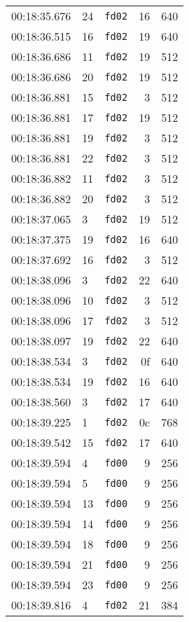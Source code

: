 \documentclass{article}
\begin{document}
\begin{longtable}{lllrr}
00:18:35.676 & 24 & \texttt{fd02} & 16 & 640 \\
00:18:36.515 & 16 & \texttt{fd02} & 19 & 640 \\
00:18:36.686 & 11 & \texttt{fd02} & 19 & 512 \\
00:18:36.686 & 20 & \texttt{fd02} & 19 & 512 \\
00:18:36.881 & 15 & \texttt{fd02} & 3 & 512 \\
00:18:36.881 & 17 & \texttt{fd02} & 19 & 512 \\
00:18:36.881 & 19 & \texttt{fd02} & 3 & 512 \\
00:18:36.881 & 22 & \texttt{fd02} & 3 & 512 \\
00:18:36.882 & 11 & \texttt{fd02} & 3 & 512 \\
00:18:36.882 & 20 & \texttt{fd02} & 3 & 512 \\
00:18:37.065 & 3 & \texttt{fd02} & 19 & 512 \\
00:18:37.375 & 19 & \texttt{fd02} & 16 & 640 \\
00:18:37.692 & 16 & \texttt{fd02} & 3 & 512 \\
00:18:38.096 & 3 & \texttt{fd02} & 22 & 640 \\
00:18:38.096 & 10 & \texttt{fd02} & 3 & 512 \\
00:18:38.096 & 17 & \texttt{fd02} & 3 & 512 \\
00:18:38.097 & 19 & \texttt{fd02} & 22 & 640 \\
00:18:38.534 & 3 & \texttt{fd02} & 0f & 640 \\
00:18:38.534 & 19 & \texttt{fd02} & 16 & 640 \\
00:18:38.560 & 3 & \texttt{fd02} & 17 & 640 \\
00:18:39.225 & 1 & \texttt{fd02} & 0c & 768 \\
00:18:39.542 & 15 & \texttt{fd02} & 17 & 640 \\
00:18:39.594 & 4 & \texttt{fd00} & 9 & 256 \\
00:18:39.594 & 5 & \texttt{fd00} & 9 & 256 \\
00:18:39.594 & 13 & \texttt{fd00} & 9 & 256 \\
00:18:39.594 & 14 & \texttt{fd00} & 9 & 256 \\
00:18:39.594 & 18 & \texttt{fd00} & 9 & 256 \\
00:18:39.594 & 21 & \texttt{fd00} & 9 & 256 \\
00:18:39.594 & 23 & \texttt{fd00} & 9 & 256 \\
00:18:39.816 & 4 & \texttt{fd02} & 21 & 384 \\

\end{longtable}
\end{document}
